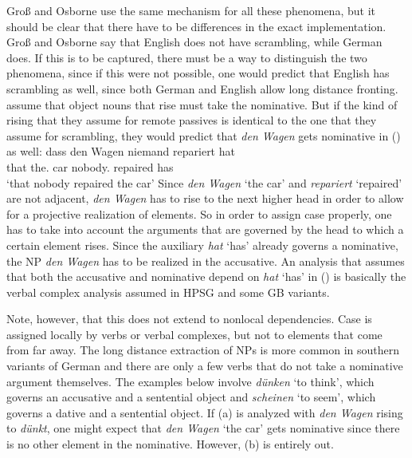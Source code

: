 Groß and Osborne use the same mechanism for all these phenomena, but it should be clear that there
have to be differences in the exact implementation. Groß and Osborne say that English does not have
scrambling, while German does. If this is to be captured, there must be a way to distinguish the two
phenomena, since if this were not possible, one would predict that English has scrambling as well,
since both German and English allow long distance fronting. \citet[]{GO2009a} assume
that object nouns that rise must take the nominative. But if the kind of rising that they assume
for remote passives is identical to the one that they assume for scrambling, they would predict that
\emph{den Wagen} gets nominative in () as well:
\ea
\gll dass den Wagen niemand repariert hat\\
     that the.\acc{} car nobody.\nom{} repaired has\\
\glt `that nobody repaired the car'
\z
Since \emph{den Wagen} `the car' and \emph{repariert} `repaired' are not adjacent, \emph{den Wagen} has to rise to the
next higher head in order to allow for a projective realization of elements. So in order to assign
case properly, one has to take into account the arguments that are governed by the head to which a
certain element rises. Since the auxiliary \emph{hat} `has' already governs a nominative, the NP \emph{den
  Wagen} has to be realized in the accusative. An analysis that assumes that both the accusative and
nominative depend on \emph{hat} `has' in () is basically the verbal complex analysis
assumed in HPSG and some GB variants.

Note, however, that this does not extend to nonlocal dependencies. Case is assigned locally by verbs or
verbal complexes, but not to elements that come from far away. The long distance extraction of
NPs is more common in southern variants of German and there are only a few verbs that do not take a
nominative argument themselves. The examples below involve \emph{dünken} `to think', which governs an
accusative and a sentential object and \emph{scheinen} `to seem', which governs a dative and a
sentential object. If (a) is analyzed with \emph{den Wagen} rising to
\emph{dünkt}, one might expect that \emph{den Wagen} `the car' gets nominative since there is no other element
in the nominative. However, (b) is entirely out.

\eal
{}
\zl

